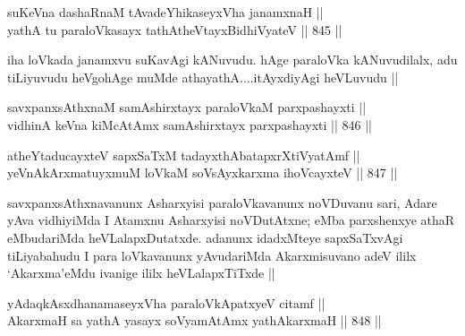 \begin{shl}
suKeVna dashaRnaM tAvadeYhikaseyxVha janamxnaH ||  \\
yathA tu paraloVkasayx tathA\s theVtayxBidhiVyateV ||  845 || 
\end{shl}

\begin{artha}
iha loVkada janamxvu suKavAgi kANuvudu. hAge paraloVka kANuvudilalx, adu tiLiyuvudu heVgohAge muMde athayathA....itAyxdiyAgi heVLuvudu ||
\end{artha}

\begin{shl}
savxpanxsAthxnaM samAshirxtayx paraloVkaM parxpashayxti || \\
vidhinA keVna kiMcA\s \s tAmx samAshirxtayx parxpashayxti ||  846 ||  
\end{shl}
				
\begin{shl}
atheYtaducayxteV sapxSaTxM tadayxthAbatapxrXtiVyatAmf || \\
yeVnA\s \s kArxmatuyxmuM loVkaM soV\s sAyx\s \s karxma ihoVcayxteV ||  847 ||  
\end{shl}

\begin{artha}
savxpanxsAthxnavanunx Asharxyisi paraloVkavanunx noVDuvanu sari, Adare yAva vidhiyiMda I Atamxnu Asharxyisi noVDutAtxne; eMba parxshenxye athaR eMbudariMda heVLalapxDutatxde. adanunx idadxMteye sapxSaTxvAgi tiLiyabahudu I para loVkavanunx yAvudariMda Akarxmisuvano adeV ililx `Akarxma'eMdu ivanige ililx heVLalapxTiTxde ||
\end{artha}


\begin{shl}
yAdaqkAsxdhanamaseyxVha paraloVkApatxyeV citamf ||  \\
AkarxmaH sa yathA yasayx soV\s yamAtAmx yathAkarxmaH ||  848 ||  
\end{shl}


